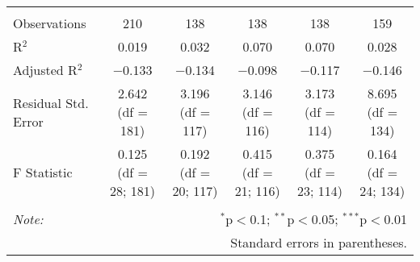 \begin{tabular}{@{\extracolsep{5pt}}lccccc}
\hline \\[-1.8ex] 
Observations & 210 & 138 & 138 & 138 & 159 \\ 
R$^{2}$ & 0.019 & 0.032 & 0.070 & 0.070 & 0.028 \\ 
Adjusted R$^{2}$ & $-$0.133 & $-$0.134 & $-$0.098 & $-$0.117 & $-$0.146 \\ 
Residual Std. Error & 2.642 (df = 181) & 3.196 (df = 117) & 3.146 (df = 116) & 3.173 (df = 114) & 8.695 (df = 134) \\ 
F Statistic & 0.125 (df = 28; 181) & 0.192 (df = 20; 117) & 0.415 (df = 21; 116) & 0.375 (df = 23; 114) & 0.164 (df = 24; 134) \\ 
\hline 
\hline \\[-1.8ex] 
\textit{Note:}  & \multicolumn{5}{r}{$^{*}$p$<$0.1; $^{**}$p$<$0.05; $^{***}$p$<$0.01} \\ 
 & \multicolumn{5}{r}{Standard errors in parentheses.} \\ 
\end{tabular} 
\endgroup 
